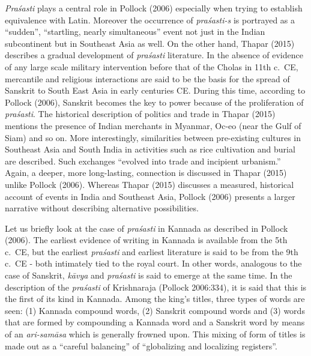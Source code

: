 {\sl Praśasti} plays a central role in Pollock (2006) especially when trying to establish equivalence with Latin. Moreover the occurrence of {\sl praśasti-s} is portrayed as a “sudden”, “startling, nearly simultaneous” event not just in the Indian subcontinent but in Southeast Asia as well. On the other hand, Thapar (2015) describes a gradual development of {\sl praśasti} literature. In the absence of evidence of any large scale military intervention before that of the Cholas in 11th c.\ CE, mercantile and religious interactions are said to be the basis for the spread of Sanskrit to South East Asia in early centuries CE. During this time, according to Pollock (2006), Sanskrit becomes the key to power because of the proliferation of {\sl praśasti}. The historical description of politics and trade in Thapar (2015) mentions the presence of Indian merchants in Myanmar, Oc-eo (near the Gulf of Siam) and so on. More interestingly, similarities between pre-existing cultures in Southeast Asia and South India in activities such as rice cultivation and burial are described. Such exchanges “evolved into trade and incipient urbanism.” Again, a deeper, more long-lasting, connection is discussed in Thapar (2015) unlike Pollock (2006). Whereas Thapar (2015) discusses a measured, historical account of events in India and Southeast Asia, Pollock (2006) presents a larger narrative without describing alternative possibilities.

Let us briefly look at the case of {\sl praśasti} in Kannada as described in Pollock (2006). The earliest evidence of writing in Kannada is available from the 5th c.\ CE, but the earliest {\sl praśasti} and earliest literature is said to be from the 9th c.\ CE - both intimately tied to the royal court. In other words, analogous to the case of Sanskrit, {\sl kāvya} and {\sl praśasti} is said to emerge at the same time. In the description of the {\sl praśasti} of Krishnaraja (Pollock 2006:334), it is said that this is the first of its kind in Kannada. Among the king’s titles, three types of words are seen: (1) Kannada compound words, (2) Sanskrit compound words and (3) words that are formed by compounding a Kannada word and a Sanskrit word by means of an {\sl ari-samāsa} which is generally frowned upon. This mixing of form of titles is made out as a “careful balancing” of “globalizing and localizing registers”.

